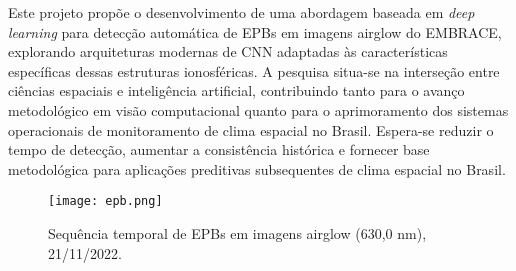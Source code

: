 Este projeto propõe o desenvolvimento de uma abordagem baseada em \textit{deep learning} para detecção automática de EPBs em imagens airglow do EMBRACE, explorando arquiteturas modernas de CNN adaptadas às características específicas dessas estruturas ionosféricas. A pesquisa situa-se na interseção entre ciências espaciais e inteligência artificial, contribuindo tanto para o avanço metodológico em visão computacional quanto para o aprimoramento dos sistemas operacionais de monitoramento de clima espacial no Brasil. Espera-se reduzir o tempo de detecção, aumentar a consistência histórica e fornecer base metodológica para aplicações preditivas subsequentes de clima espacial no Brasil.

\begin{figure}[htb]
    \centering
    \texttt{[image: epb.png]}
    \caption[Sequência temporal de EPBs em airglow]{Sequência temporal de EPBs em imagens airglow (630{,}0 nm), 21/11/2022.}
    \label{fig:epb_temporal}
\end{figure}